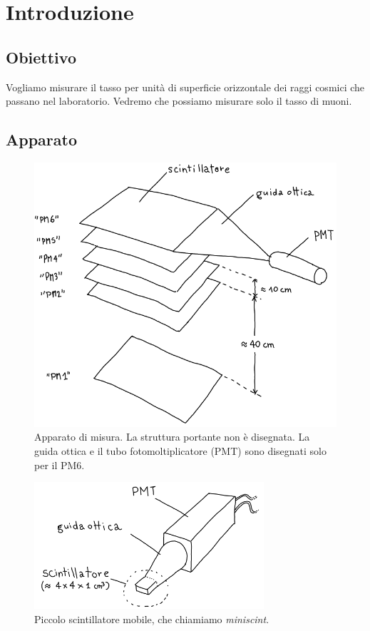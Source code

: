 \section{Introduzione}

\subsection{Obiettivo}

Vogliamo misurare il tasso per unità di superficie orizzontale
dei raggi cosmici che passano nel laboratorio.
Vedremo che possiamo misurare solo il tasso di muoni.

\subsection{Apparato}

\begin{figure}
	\center
	\includegraphics[width=\textwidth]{apparato}
	\caption{\label{fig:apparato}
	Apparato di misura.
	La struttura portante non è disegnata.
	La guida ottica e il tubo fotomoltiplicatore (PMT) sono disegnati solo per il PM6.}
\end{figure}

\begin{figure}
	\center
	\includegraphics[width=23em]{miniscint}
	\caption{\label{fig:miniscint}
	Piccolo scintillatore mobile, che chiamiamo \emph{miniscint}.}
\end{figure}

